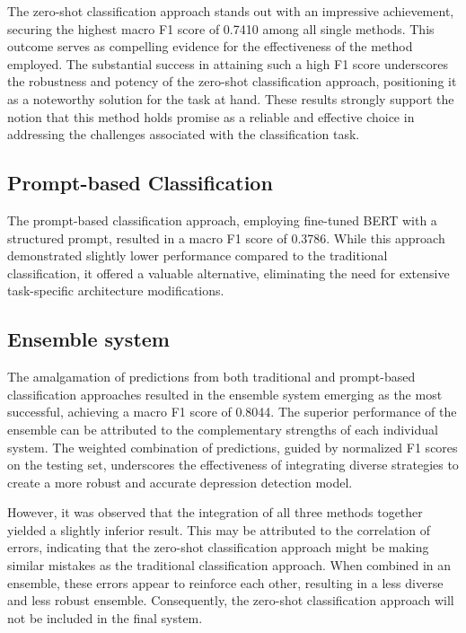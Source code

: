 \documentclass{article}
\begin{document}
The zero-shot classification approach stands out with an impressive achievement, securing the highest macro F1 score of 0.7410 among all single methods. This outcome serves as compelling evidence for the effectiveness of the method employed. The substantial success in attaining such a high F1 score underscores the robustness and potency of the zero-shot classification approach, positioning it as a noteworthy solution for the task at hand. These results strongly support the notion that this method holds promise as a reliable and effective choice in addressing the challenges associated with the classification task.

\subsection{Prompt-based Classification}

The prompt-based classification approach, employing fine-tuned BERT with a structured prompt, resulted in a macro F1 score of 0.3786. While this approach demonstrated slightly lower performance compared to the traditional classification, it offered a valuable alternative, eliminating the need for extensive task-specific architecture modifications.

\subsection{Ensemble system}

The amalgamation of predictions from both traditional and prompt-based classification approaches resulted in the ensemble system emerging as the most successful, achieving a macro F1 score of 0.8044. The superior performance of the ensemble can be attributed to the complementary strengths of each individual system. The weighted combination of predictions, guided by normalized F1 scores on the testing set, underscores the effectiveness of integrating diverse strategies to create a more robust and accurate depression detection model.

However, it was observed that the integration of all three methods together yielded a slightly inferior result. This may be attributed to the correlation of errors, indicating that the zero-shot classification approach might be making similar mistakes as the traditional classification approach. When combined in an ensemble, these errors appear to reinforce each other, resulting in a less diverse and less robust ensemble. Consequently, the zero-shot classification approach will not be included in the final system.
\end{document}
